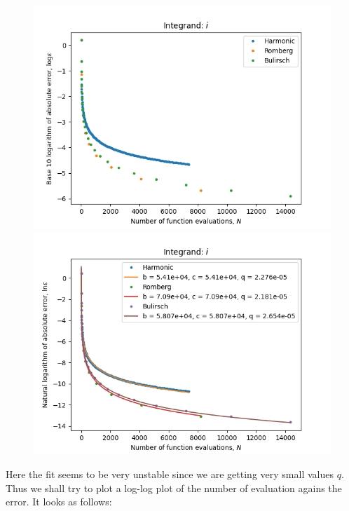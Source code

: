 \begin{figure}[H]
\centering
\begin{minipage}{0.45\textwidth}
\centering
\includegraphics[scale=0.45]{romberg_plots/circle_area_hp.png}
\end{minipage}
\begin{minipage}{0.45\textwidth}
\centering
\includegraphics[scale=0.45]{romberg_plots/circle_area_hp_trend.png}
\end{minipage}
\end{figure}

Here the fit seems to be very unstable since we are getting very small values \(q\). Thus we shall try to plot a log-log plot of the number of evaluation agains the error. It looks as follows: 

